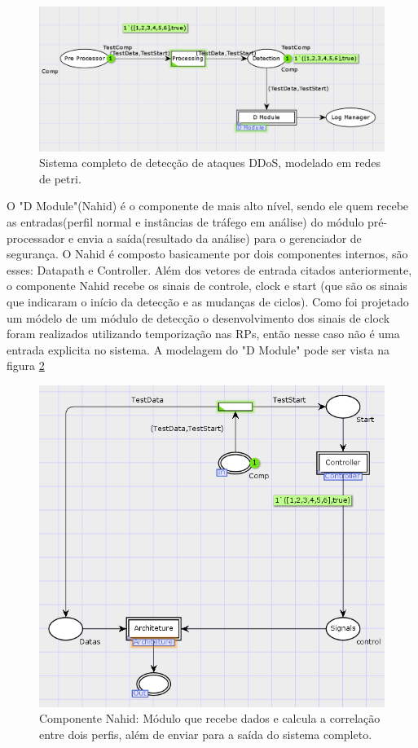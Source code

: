 \documentclass[conference]{IEEEtran}
\begin{document}
	\begin{figure}[htbp]
	\centerline{\includegraphics[scale=0.30]{an.png}}
	\caption{Sistema completo de detecção de ataques DDoS, modelado em redes de petri.}
	\label{altonivel}
	\end{figure}
	O "D Module"(Nahid) é o componente de mais alto nível, sendo ele quem recebe as entradas(perfil normal e instâncias de tráfego em análise) do módulo pré-processador e envia a saída\label{key}(resultado da análise) para o gerenciador de segurança. O Nahid é composto basicamente por dois componentes internos, são esses: Datapath e Controller. Além dos vetores de entrada citados anteriormente, o componente Nahid recebe os sinais de controle, clock e start (que são os sinais que indicaram o início da detecção e as mudanças de ciclos). Como foi projetado um módelo de um módulo de detecção o desenvolvimento dos sinais de clock foram realizados utilizando temporização nas RPs, então nesse caso não é uma entrada explicita no sistema. A modelagem do "D Module" pode ser vista na figura \ref{nahid} \\      
	
		\begin{figure}[htbp]
		\centerline{\includegraphics[scale=0.54]{nahid.png}}
		\caption{Componente Nahid: Módulo que recebe dados e calcula a correlação entre dois perfis, além de enviar para a saída do sistema completo. }
		\label{nahid}
	\end{figure}
\end{document}
